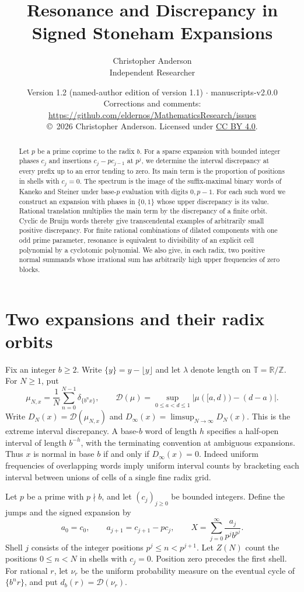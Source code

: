 \documentclass[11pt]{article}
\title{Resonance and Discrepancy in Signed Stoneham Expansions}
\author{Christopher Anderson\\ {\small Independent Researcher}}
\date{\small Version 1.2 (named-author edition of version 1.1) $\cdot$ manuscripts-v2.0.0\\ \footnotesize Corrections and comments: \url{https://github.com/eldernos/MathematicsResearch/issues}\\ \copyright\ 2026 Christopher Anderson. Licensed under \href{https://creativecommons.org/licenses/by/4.0/}{CC BY 4.0}.}
\newcommand{\Z}{\mathbb Z}
\newcommand{\R}{\mathbb R}
\newcommand{\Disc}{\mathcal D}
\newcommand{\fr}[1]{\{#1\}}
\newcommand{\orb}{\mathbb T}
\begin{document}
\maketitle
\begin{abstract}
Let \(p\) be a prime coprime to the radix \(b\). For a sparse expansion with bounded integer phases \(c_j\) and insertions \(c_j-pc_{j-1}\) at \(p^j\), we determine the interval discrepancy at every prefix up to an error tending to zero. Its main term is the proportion of positions in shells with \(c_j=0\). The spectrum is the image of the suffix-maximal binary words of Kaneko and Steiner under base-\(p\) evaluation with digits \(0,p-1\). For each such word we construct an expansion with phases in \(\{0,1\}\) whose upper discrepancy is its value. Rational translation multiplies the main term by the discrepancy of a finite orbit. Cyclic de Bruijn words thereby give transcendental examples of arbitrarily small positive discrepancy. For finite rational combinations of dilated components with one odd prime parameter, resonance is equivalent to divisibility of an explicit cell polynomial by a cyclotomic polynomial. We also give, in each radix, two positive normal summands whose irrational sum has arbitrarily high upper frequencies of zero blocks.
\end{abstract}

\section{Two expansions and their radix orbits}
Fix an integer \(b\ge2\). Write \(\fr y=y-\lfloor y\rfloor\) and let \(\lambda\) denote length on \(\orb=\R/\Z\). For \(N\ge1\), put
\[
 \mu_{N,x}=\frac1N\sum_{n=0}^{N-1}\delta_{\fr{b^n x}},\qquad
 \Disc(\mu)=\sup_{0\le a<d\le1}|\mu([a,d))-(d-a)| .
\]
Write \(D_N(x)=\Disc(\mu_{N,x})\) and \(D_\infty(x)=\limsup_{N\to\infty}D_N(x)\). This is the extreme interval discrepancy. A base-\(b\) word of length \(h\) specifies a half-open interval of length \(b^{-h}\), with the terminating convention at ambiguous expansions. Thus \(x\) is normal in base \(b\) if and only if \(D_\infty(x)=0\). Indeed uniform frequencies of overlapping words imply uniform interval counts by bracketing each interval between unions of cells of a single fine radix grid.

Let \(p\) be a prime with \(p\nmid b\), and let \((c_j)_{j\ge0}\) be bounded integers. Define the jumps and the signed expansion by
\begin{equation}\label{eq:X}
 a_0=c_0,\qquad a_{j+1}=c_{j+1}-pc_j,\qquad
 X=\sum_{j=0}^{\infty}\frac{a_j}{p^j b^{p^j}} .
\end{equation}
Shell \(j\) consists of the integer positions \(p^j\le n<p^{j+1}\). Let \(Z(N)\) count the positions \(0\le n<N\) in shells with \(c_j=0\). Position zero precedes the first shell. For rational \(r\), let \(\nu_r\) be the uniform probability measure on the eventual cycle of \(\fr{b^n r}\), and put \(d_b(r)=\Disc(\nu_r)\).
\end{document}
